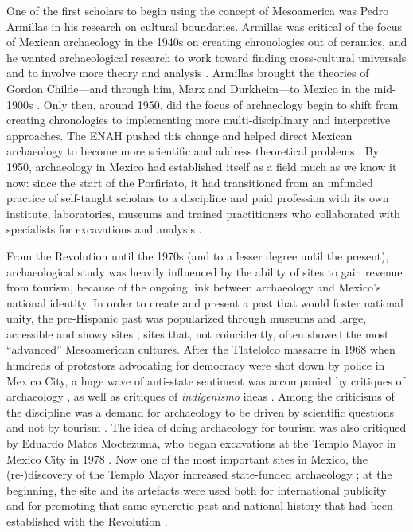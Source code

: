 One of the first scholars to begin using the concept of Mesoamerica was Pedro Armillas in his research on cultural boundaries. Armillas was critical of the focus of Mexican archaeology in the 1940s on creating chronologies out of ceramics, and he wanted archaeological research to work toward finding cross-cultural universals and to involve more theory and analysis \parencite[4810]{Runggaldier2001}. 
Armillas brought the theories of Gordon Childe—and through him, Marx and Durkheim—to Mexico in the mid-1900s \parencite[17]{Matos1979}. 
Only then, around 1950, did the focus of archaeology begin to shift from creating chronologies to implementing more multi-disciplinary and interpretive approaches. The ENAH pushed this change and helped direct Mexican archaeology to become more scientific and address theoretical problems \parencite[19]{Matos1979}. 
By 1950, archaeology in Mexico had established itself as a field much as we know it now: since the start of the Porfiriato, it had transitioned from an unfunded practice of self-taught scholars to a discipline and paid profession with its own institute, laboratories, museums and trained practitioners who collaborated with specialists for excavations and analysis \parencite[188]{Bernal1980}.


From the Revolution until the 1970s (and to a lesser degree until the present), archaeological study was heavily influenced by the ability of sites to gain revenue from tourism, because of the ongoing link between archaeology and Mexico’s national identity. In order to create and present a past that would foster national unity, the pre-Hispanic past was popularized through museums and large, accessible and showy sites \parencite[277]{Trigger2006}, 
sites that, not coincidently, often showed the most “advanced” Mesoamerican cultures. After the Tlatelolco massacre in 1968 when hundreds of protestors advocating for democracy were shot down by police in Mexico City, a huge wave of anti-state sentiment was accompanied by critiques of archaeology \parencite[80]{Patterson1995}, 
as well as critiques of \textit{indigenismo} ideas \parencite[61]{Ortiz1996}. 
Among the criticisms of the discipline was a demand for archaeology to be driven by scientific questions and not by tourism \parencite[80]{Patterson1995}. 
The idea of doing archaeology for tourism was also critiqued by Eduardo Matos Moctezuma, who began excavations at the Templo Mayor in Mexico City in 1978 \parencite[80]{Patterson1995}. 
Now one of the most important sites in Mexico, the (re-)discovery of the Templo Mayor increased state-funded archaeology \parencite[80]{Patterson1995}; 
at the beginning, the site and its artefacts were used both for international publicity and for promoting that same syncretic past and national history that had been established with the Revolution \parencite[234]{Fowler1987}.

